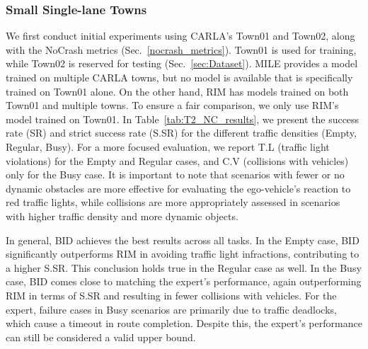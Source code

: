 \subsubsection{Small Single-lane Towns} \label{sec:small_town_results}

\hspace{1pc}We first conduct initial experiments using CARLA's Town01 and Town02, along with the NoCrash metrics (Sec.~\ref{nocrash_metrics}). 
Town01 is used for training, while Town02 is reserved for testing (Sec.~\ref{sec:Dataset}). 
MILE provides a model trained on multiple CARLA towns, but no model is available that is specifically trained on Town01 alone. 
On the other hand, RIM has models trained on both Town01 and multiple towns. To ensure a fair comparison, we only use RIM’s model trained on Town01. 
In Table~\ref{tab:T2_NC_results}, we present the success rate (SR) and strict success rate (S.SR) for the different traffic densities (Empty, Regular, Busy). 
For a more focused evaluation, we report T.L (traffic light violations) for the Empty and Regular cases, and C.V (collisions with vehicles) only for the Busy case. 
It is important to note that scenarios with fewer or no dynamic obstacles are more effective for evaluating the ego-vehicle's reaction to red traffic lights, while collisions are more appropriately assessed in scenarios with higher traffic density and more dynamic objects.


In general, BID achieves the best results across all tasks. 
In the Empty case, BID significantly outperforms RIM in avoiding traffic light infractions, contributing to a higher S.SR. 
This conclusion holds true in the Regular case as well. 
In the Busy case, BID comes close to matching the expert’s performance, again outperforming RIM in terms of S.SR and resulting in fewer collisions with vehicles. 
For the expert, failure cases in Busy scenarios are primarily due to traffic deadlocks, which cause a timeout in route completion. 
Despite this, the expert's performance can still be considered a valid upper bound.


